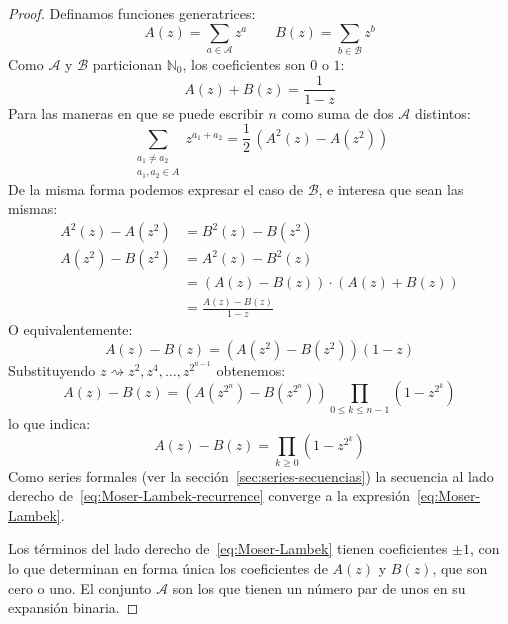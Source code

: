   \begin{proof}
    Definamos funciones generatrices:%
    \begin{equation*}
      A(z)
	= \sum_{a \in \mathcal{A}} z^a \qquad
      B(z)
	= \sum_{b \in \mathcal{B}} z^b
    \end{equation*}
    Como \(\mathcal{A}\) y \(\mathcal{B}\)
    particionan \(\mathbb{N}_0\),
    los coeficientes son \(0\) o \(1\):
    \begin{equation*}
      A(z) + B(z)
	= \frac{1}{1 - z}
    \end{equation*}
    Para las maneras en que se puede escribir \(n\)
    como suma de dos \(\mathcal{A}\) distintos:
    \begin{equation*}
      \sum_{\substack{
	      a_1 \ne a_2 \\
	      a_1, a_2 \in A
	   }}
	     z^{a_1 + a_2}
	= \frac{1}{2} \, \left( A^2(z) - A(z^2) \right)
    \end{equation*}
    De la misma forma podemos expresar el caso de \(\mathcal{B}\),
    e interesa que sean las mismas:
    \begin{align*}
      A^2(z) - A(z^2)
	&= B^2(z) - B(z^2) \\
      A(z^2) - B(z^2)
	&= A^2(z) - B^2(z) \\
	&= (A(z) - B(z)) \cdot (A(z) + B(z)) \\
	&= \frac{A(z) - B(z)}{1 - z}
    \end{align*}
    O equivalentemente:
    \begin{equation*}
      A(z) - B(z)
	= \left( A(z^2) - B(z^2) \right) (1 - z)
    \end{equation*}
    Substituyendo
      \(z \rightsquigarrow z^2, z^4, \dotsc, z^{2^{n - 1}}\)
    obtenemos:
    \begin{equation}
      \label{eq:Moser-Lambek-recurrence}
      A(z) - B(z)
	= \left( A(z^{2^n}) - B(z^{2^n}) \right)
	    \prod_{0 \le k \le n - 1} \left( 1 - z^{2^k} \right)
    \end{equation}
    lo que indica:
    \begin{equation}
      \label{eq:Moser-Lambek}
      A(z) - B(z)
	= \prod_{k \ge 0} \left( 1 - z^{2^k} \right)
    \end{equation}
    Como series formales
    (ver la sección~\ref{sec:series-secuencias})%
    la secuencia
    al lado derecho de~\eqref{eq:Moser-Lambek-recurrence}
    converge a la expresión~\eqref{eq:Moser-Lambek}.

    Los términos del lado derecho de~\eqref{eq:Moser-Lambek}
    tienen coeficientes \(\pm 1\),
    con lo que determinan en forma única
    los coeficientes de \(A(z)\) y \(B(z)\),
    que son cero o uno.
    El conjunto \(\mathcal{A}\)
    son los que tienen un número par de unos
    en su expansión binaria.
  \end{proof}

